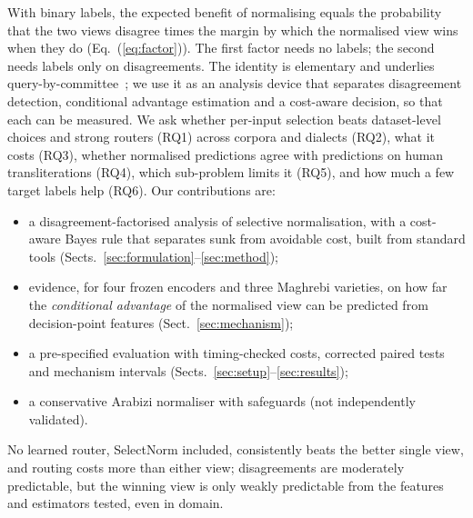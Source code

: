 With binary labels, the expected benefit of normalising equals the probability that the two views disagree times the margin by which the normalised view wins when they do (Eq.~(\ref{eq:factor})). The first factor needs no labels; the second needs labels only on disagreements. The identity is elementary and underlies query-by-committee~\cite{seung1992qbc}; we use it as an analysis device that separates disagreement detection, conditional advantage estimation and a cost-aware decision, so that each can be measured. We ask whether per-input selection beats dataset-level choices and strong routers (RQ1) across corpora and dialects (RQ2), what it costs (RQ3), whether normalised predictions agree with predictions on human transliterations (RQ4), which sub-problem limits it (RQ5), and how much a few target labels help (RQ6). Our contributions are:
\begin{itemize}[leftmargin=1.2em,itemsep=0pt,topsep=2pt]
\item a disagreement-factorised analysis of selective normalisation, with a cost-aware Bayes rule that separates sunk from avoidable cost, built from standard tools (Sects.~\ref{sec:formulation}--\ref{sec:method});
\item evidence, for four frozen encoders and three Maghrebi varieties, on how far the \emph{conditional advantage} of the normalised view can be predicted from decision-point features (Sect.~\ref{sec:mechanism});
\item a pre-specified evaluation with timing-checked costs, corrected paired tests and mechanism intervals (Sects.~\ref{sec:setup}--\ref{sec:results});
\item a conservative Arabizi normaliser with safeguards (not independently validated).
\end{itemize}
No learned router, SelectNorm included, consistently beats the better single view, and routing costs more than either view; disagreements are moderately predictable, but the winning view is only weakly predictable from the features and estimators tested, even in domain.
